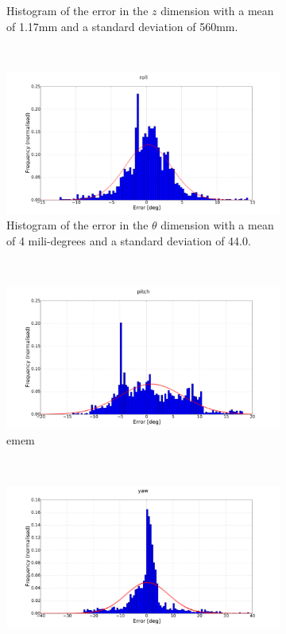 \begin{figure}
\begin{subfigure}{0.45\textwidth}
     \caption{Histogram of the error in the $z$ dimension with a mean of 1.17mm and a standard deviation of 560mm.}
  \label{fig:norm-z}
  \end{subfigure}
~
  \begin{subfigure}{0.45\textwidth}
     \includegraphics[clip, trim = 150 50 155 0, width=\textwidth]{figures/chapter3/norm_roll}
     \caption{Histogram of the error in the $\theta$ dimension with a mean of 4 mili-degrees and a standard deviation of 44.0\degree.}
  \label{fig:norm-roll}
  \end{subfigure}
~
  \begin{subfigure}{0.45\textwidth}
     \includegraphics[clip, trim = 150 50 155 0, width=\textwidth]{figures/chapter3/norm_pitch}
     \caption{emem}
  \label{fig:norm-pitch}
  \end{subfigure}
~
  \begin{subfigure}{0.45\textwidth}
     \includegraphics[clip, trim = 150 50 155 0, width=\textwidth]{figures/chapter3/norm_yaw}

\end{subfigure}
\end{figure}

